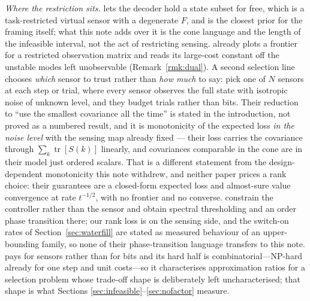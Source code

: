 \emph{Where the restriction sits.} \cite{cuvelier2021side} lets the decoder hold a
state subset for free, which is a task-restricted virtual sensor with a degenerate
$F$, and is the closest prior for the framing itself; what this note adds over it
is the cone language and the length of the infeasible interval, not the act of
restricting sensing. \cite{sabag2021reducing} already plots a frontier for a
restricted observation matrix and reads its large-cost constant off the unstable
modes left unobservable (Remark~\ref{rmk:dual}). A second selection line chooses
\emph{which} sensor to trust rather than \emph{how much} to say:
\cite{li2023learning,li2026oss} pick one of $N$ sensors at each step or trial, where
every sensor observes the full state with isotropic noise of unknown level, and they
budget trials rather than bits. Their reduction to ``use the smallest covariance all
the time'' is stated in the introduction, not proved as a numbered result, and it is
monotonicity of the expected loss \emph{in the noise level} with the sensing map
already fixed --- their loss carries the covariance through
$\sum_k\operatorname{tr}[S(k)]$ linearly, and covariances comparable in the cone are
in their model just ordered scalars. That is a different statement from the
design-dependent monotonicity this note withdrew, and neither paper prices a rank
choice: their guarantees are a closed-form expected loss and almost-sure value
convergence at rate $t^{-1/2}$, with no frontier and no converse.
\cite{fox2016a,fox2016b} constrain
the controller rather than the sensor and obtain spectral thresholding and an order
phase transition there; our rank loss is on the sensing side, and the switch-on
rates of Section~\ref{sec:waterfill} are stated as measured behaviour of an
upper-bounding family, so none of their phase-transition language transfers to this
note. \cite{tzoumas2020co} pays for sensors rather than for bits and its hard half
is combinatorial---NP-hard already for one step and unit costs---so it
characterises approximation ratios for a selection problem whose trade-off shape is
deliberately left uncharacterised; that shape is what Sections
\ref{sec:infeasible}--\ref{sec:nofactor} measure.

